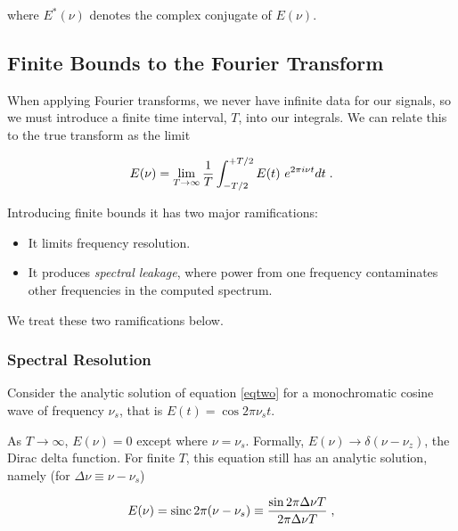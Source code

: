 \documentclass[11pt,preprint]{aastex}
\begin{document}
\noindent where $E^*(\nu)$ denotes the complex conjugate of $E(\nu)$.

\subsection{Finite Bounds to the Fourier Transform}
\label{sectiontwo}

When applying Fourier transforms, we never have infinite data for our signals, so we must
introduce a finite time interval, $T$, into our integrals. We can relate 
this to the true transform as the limit

\begin{equation} \label{eqtwo}
E(\nu) = \lim_{T \to \infty} {1 \over T}
\int_{-T/2}^{+T/2} E(t)\ e^{2 \pi i \nu t}  dt \; .
\end{equation}

\noindent
Introducing finite bounds it has two major ramifications:
\begin{itemize}

	\item It limits frequency resolution.

	\item It produces {\it spectral leakage}, where power from one
frequency contaminates other frequencies in the computed spectrum.
\end{itemize}

\noindent
We treat these two ramifications below.

\subsubsection{Spectral Resolution} \label{spctres}

\noindent
Consider the analytic solution of
equation \ref{eqtwo} for a monochromatic cosine wave of frequency
$\nu_s$, that is $E(t) = \cos 2 \pi \nu_s t$.

As $T \rightarrow \infty$, $E(\nu) = 0$ except where $\nu = \nu_s$.
Formally, $E(\nu)\to\delta(\nu-\nu_z)$, 
the Dirac delta function.  For finite $T$, this equation still has
an analytic solution, namely (for $\Delta\nu\equiv\nu-\nu_s$)

\begin{equation} \label{sinxoverx}
E(\nu) = {\rm sinc}\,{2\pi(\nu-\nu_s)}
\equiv\frac{\sin  2 \pi \Delta\nu T}{ 2 \pi \Delta\nu T} \; ,  
\end{equation}
%
%
\end{document}
